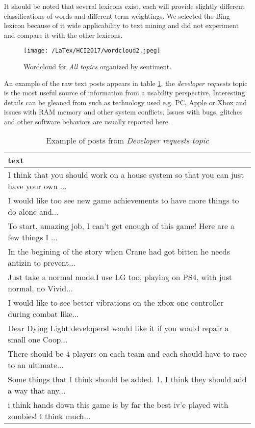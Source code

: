 \documentclass{ewic}
\begin{document}
It should be noted that several lexicons exist, each will provide slightly different classifications of words and different term weightings. We selected the Bing lexicon because of it wide applicability to text mining and did not experiment and compare it with the other lexicons.  

\begin{figure}[h]
  \begin{center}
\texttt{[image: /LaTex/HCI2017/wordcloud2.jpeg]} %
  \end{center}
 \caption{Wordcloud for {\it All topics} organized by sentiment.}
\label{wc2}
\end{figure}

An example of the raw text posts appears in table \ref{table1st}, the {\it developer requests}  topic  is the most useful source of information from a usability perspective. Interesting details can be gleaned from such as technology used e.g. PC, Apple or Xbox and issues with RAM memory and other system conflicts. Issues with bugs, glitches and other software behaviors are usually reported here.

\begin{table}[ht]
\centering \scriptsize
\begin{tabular}{l}
  \hline
text  \\ 
  \hline
I think that you should work on a house system so that you can just have your own ...\\ 
I would like too see new game achievements to have more things to do alone and... \\ 
To start, amazing job, I can't get enough of this game! Here are a few things I ... \\ 
In the begining of the story when Crane had got bitten he needs antizin to prevent... \\ 
Just take a normal mode.I use LG too, playing on PS4, with just normal, no Vivid...\\ 
I would like to see better vibrations on the xbox one controller during combat like...\\ 
Dear Dying Light developersI would like it if you would repair a small one Coop... \\ 
There should be 4 players on each team and each should have to race to an ultimate...\\ 
Some things that I think should be added. 1. I think they should add a way that any...\\
i think hands down this game is by far the best iv'e played with zombies! I think much...\\
   \hline
\end{tabular} \normalsize
 \caption{Example of posts from {\it Developer requests topic}}
 \label{table1st}
\end{table}
\end{document}
